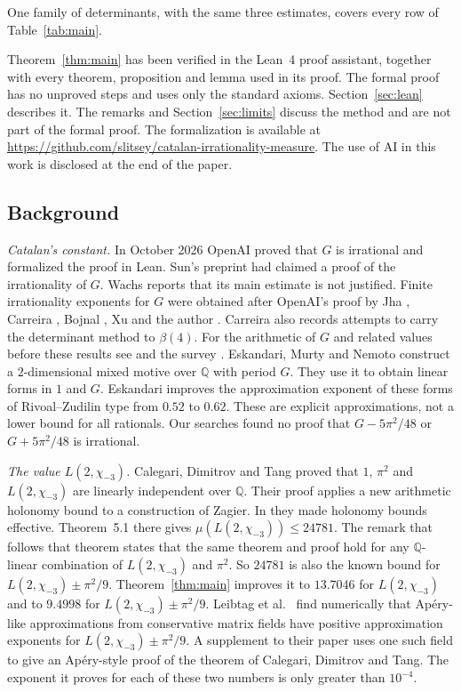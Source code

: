 \documentclass[11pt]{amsart}
\newcommand{\FormalizationURL}{https://github.com/slitsey/catalan-irrationality-measure}
\newcommand{\FormalizationLink}{\url{\FormalizationURL}}
\theoremstyle{definition}
\theoremstyle{remark}
\numberwithin{equation}{section}
\newcommand{\Q}{\mathbb Q}
\newcommand{\MuThirdsU}{9.4998}
\newcommand{\MuChi}{13.7046}
\begin{document}
One family of determinants, with the same three estimates, covers every row of Table~\ref{tab:main}.

Theorem~\ref{thm:main} has been verified in the Lean~4 proof assistant, together with every theorem, proposition and
lemma used in its proof. The formal proof has no unproved steps and uses only the standard axioms.
Section~\ref{sec:lean} describes it. The remarks and Section~\ref{sec:limits} discuss the method and are not part of the
formal proof. The formalization is available at \FormalizationLink. The use of AI in this work is disclosed at the end
of the paper.

\subsection{Background}
\emph{Catalan's constant.} In October 2026 OpenAI \cite{OpenAI2026} proved that $G$ is irrational and formalized the
proof in Lean. Sun's preprint \cite{Sun2026} had claimed a proof of the irrationality of $G$. Wachs \cite{Wachs2026}
reports that its main estimate is not justified. Finite irrationality exponents for $G$ were obtained after OpenAI's
proof by Jha \cite{Jha2026}, Carreira \cite{Carreira2026}, Bojnal \cite{Bojnal2026}, Xu \cite{Xu2026} and the author
\cite{Litsey2026}. Carreira \cite{Carreira2026b} also records attempts to carry the determinant method to $\beta(4)$. For
the arithmetic of $G$ and related values before these results see
\cite{RivoalZudilin2003,Zudilin2003,Zudilin02Cheb,KrattRivoal08,KrattZudilin19} and the survey \cite{Zudilin19Survey}.
Eskandari, Murty and Nemoto \cite{EMN2025} construct a $2$-dimensional mixed motive over $\Q$ with period $G$. They use
it to obtain linear forms in $1$ and $G$. Eskandari \cite{Eskandari2026} improves the approximation exponent of these
forms of Rivoal--Zudilin type from $0.52$ to $0.62$. These are explicit approximations, not a lower bound for all
rationals. Our searches found no proof that $G-5\pi^2/48$ or $G+5\pi^2/48$ is irrational.

\emph{The value $L(2,\chi_{-3})$.} Calegari, Dimitrov and Tang \cite{CDT2024} proved that $1$, $\pi^2$ and
$L(2,\chi_{-3})$ are linearly independent over $\Q$. Their proof applies a new arithmetic holonomy bound to a
construction of Zagier. In \cite{CDT2025} they made holonomy bounds effective. Theorem~5.1 there gives
$\mu(L(2,\chi_{-3}))\le24781$. The remark that follows that theorem states that the same theorem and proof hold for any
$\Q$-linear combination of $L(2,\chi_{-3})$ and $\pi^2$. So $24781$ is also the known bound for
$L(2,\chi_{-3})\pm\pi^2/9$. Theorem~\ref{thm:main} improves it to $\MuChi$ for $L(2,\chi_{-3})$ and to $\MuThirdsU$ for
$L(2,\chi_{-3})\pm\pi^2/9$. Leibtag et al.\ \cite{LBKWSK26} find numerically that Ap\'ery-like approximations from
conservative matrix fields have positive approximation exponents for $L(2,\chi_{-3})\pm\pi^2/9$. A supplement to their
paper uses one such field to give an Ap\'ery-style proof of the theorem of Calegari, Dimitrov and Tang. The exponent it
proves for each of these two numbers is only greater than $10^{-4}$.
\end{document}
